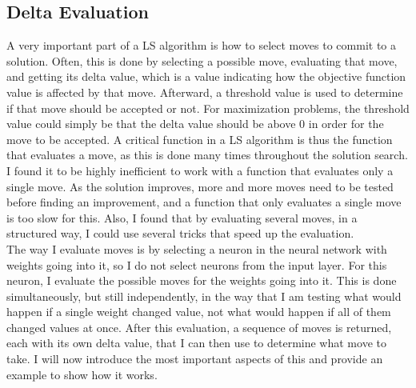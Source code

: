 \subsection{Delta Evaluation}
A very important part of a LS algorithm is how to select moves to commit to a solution. Often, this is done by selecting a possible move, evaluating that move, and getting its delta value, which is a value indicating how the objective function value is affected by that move. Afterward, a threshold value is used to determine if that move should be accepted or not. For maximization problems, the threshold value could simply be that the delta value should be above 0 in order for the move to be accepted. A critical function in a LS algorithm is thus the function that evaluates a move, as this is done many times throughout the solution search. I found it to be highly inefficient to work with a function that evaluates only a single move. As the solution improves, more and more moves need to be tested before finding an improvement, and a function that only evaluates a single move is too slow for this. Also, I found that by evaluating several moves, in a structured way, I could use several tricks that speed up the evaluation. \\

\noindent The way I evaluate moves is by selecting a neuron in the neural network with weights going into it, so I do not select neurons from the input layer. For this neuron, I evaluate the possible moves for the weights going into it. This is done simultaneously, but still independently, in the way that I am testing what would happen if a single weight changed value, not what would happen if all of them changed values at once. After this evaluation, a sequence of moves is returned, each with its own delta value, that I can then use to determine what move to take. I will now introduce the most important aspects of this and provide an example to show how it works. 

